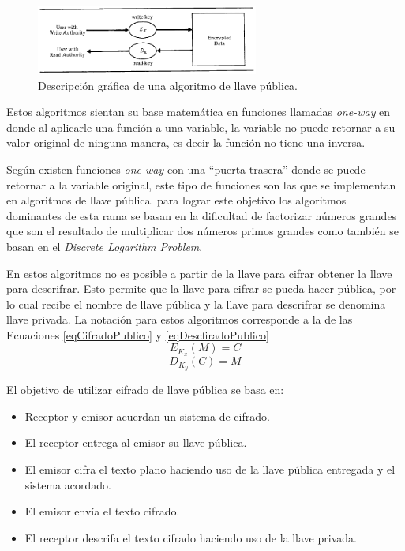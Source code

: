 \begin{figure}
	\centering
	\includegraphics[width=0.65\textwidth]{./images/figPublicKeyAlgorithm}
	\caption{Descripción gráfica de una algoritmo de llave pública.}
	\label{figPublicKeyAlgorithm}
\end{figure}

Estos algoritmos sientan su base matemática en funciones llamadas \textit{one-way} en donde al aplicarle una función a una variable, la variable no puede retornar a su valor original de ninguna manera, es decir la función no tiene una inversa. 

Según \cite{bruce} existen funciones \textit{one-way} con una ``puerta trasera'' donde se puede retornar a la variable original, este tipo de funciones son las que se implementan en algoritmos de llave pública. para lograr este objetivo los algoritmos dominantes de esta rama se basan en la dificultad de factorizar números grandes que son el resultado de multiplicar dos números primos grandes como también se basan en el \textit{Discrete Logarithm Problem}.

En estos algoritmos no es posible a partir de la llave para cifrar obtener la llave para descrifrar. Esto permite que la llave para cifrar se pueda hacer pública, por lo cual recibe el nombre de llave pública y la llave para descrifrar se denomina llave privada. La notación para estos algoritmos corresponde a la de las Ecuaciones \eqref{eqCifradoPublico} y \eqref{eqDescfiradoPublico}
\begin{equation} \label{eqCifradoPublico}
E_{K_x} (M) = C
\end{equation}
\begin{equation} \label{eqDescfiradoPublico}
D_{K_y} (C) = M
\end{equation}

El objetivo de utilizar cifrado de llave pública se basa en:
\begin{itemize}
\item Receptor y emisor acuerdan un sistema de cifrado.
\item El receptor entrega al emisor su llave pública.
\item El emisor cifra el texto plano haciendo uso de la llave pública entregada y el sistema acordado.
\item El emisor envía el texto cifrado.
\item El receptor descrifa el texto cifrado haciendo uso de la llave privada.
\end{itemize}

